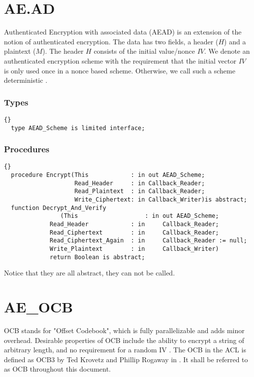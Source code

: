 \section{AE.AD}
Authenticated Encryption with associated data (AEAD) is an extension of the notion of authenticated encryption. The data has two fields, a header ($H$) and a plaintext ($M$). The header $H$ consists of the initial value/nonce $IV$. We denote an authenticated encryption scheme with the requirement that the initial vector $IV$ is only used once in a nonce based scheme. Otherwise, we call such a scheme deterministic \cite{DBLP:conf/fse/FleischmannFL12}.
\subsubsection*{Types}
\begin{lstlisting}{}
  type AEAD_Scheme is limited interface;
\end{lstlisting}
\subsubsection*{Procedures}
\begin{lstlisting}{}
  procedure Encrypt(This            : in out AEAD_Scheme;
                    Read_Header     : in Callback_Reader;
                    Read_Plaintext  : in Callback_Reader;
                    Write_Ciphertext: in Callback_Writer)is abstract;
  function Decrypt_And_Verify
  				(This                   : in out AEAD_Scheme;
             Read_Header            : in     Callback_Reader;
             Read_Ciphertext        : in     Callback_Reader;
             Read_Ciphertext_Again  : in     Callback_Reader := null;
             Write_Plaintext        : in     Callback_Writer)
             return Boolean is abstract;
\end{lstlisting}
Notice that they are all abstract, they can not be called.\\
\section{AE\_OCB}
OCB stands for "Offset Codebook", which is fully parallelizable and adds minor overhead. Desirable properties of OCB include the ability to encrypt a string of arbitrary length, and no requirement for a random IV \cite{DBLP:journals/tissec/RogawayBB03}. The OCB in the ACL is defined as OCB3 by Ted Krovetz and Phillip Rogaway in \cite{DBLP:conf/fse/KrovetzR11}. It shall be referred to as OCB throughout this document.


